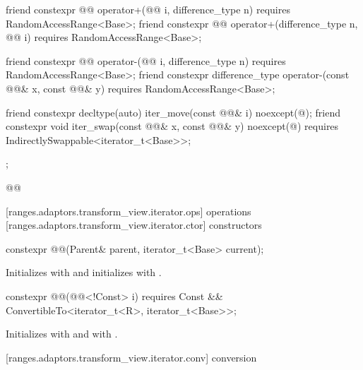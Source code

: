 \begin{codeblock}
{{{    friend constexpr @@ operator+(@@ i, difference_type n)
      requires RandomAccessRange<Base>;
    friend constexpr @@ operator+(difference_type n, @@ i)
      requires RandomAccessRange<Base>;

    friend constexpr @@ operator-(@@ i, difference_type n)
      requires RandomAccessRange<Base>;
    friend constexpr difference_type operator-(const @@& x, const @@& y)
      requires RandomAccessRange<Base>;

    friend constexpr decltype(auto) iter_move(const @@& i)
      noexcept(@\seebelow@);
    friend constexpr void iter_swap(const @@& x, const @@& y)
      noexcept(@\seebelow@) requires IndirectlySwappable<iterator_t<Base>>;
  };
}}@\removed{\}\}}@
\end{codeblock}

[ranges.adaptors.transform_view.iterator.ops]{ operations}
[ranges.adaptors.transform_view.iterator.ctor]{ constructors}

\begin{itemdecl}
constexpr @@(Parent& parent, iterator_t<Base> current);
\end{itemdecl}

\begin{itemdescr}
\pnum
\effects Initializes  with  and
initializes  with .
\end{itemdescr}

%
\begin{itemdecl}
constexpr @@(@@<!Const> i)
  requires Const && ConvertibleTo<iterator_t<R>, iterator_t<Base>>;
\end{itemdecl}

\begin{itemdescr}
\pnum
\effects Initializes  with  and 
with .
\end{itemdescr}

[ranges.adaptors.transform_view.iterator.conv]{ conversion}

